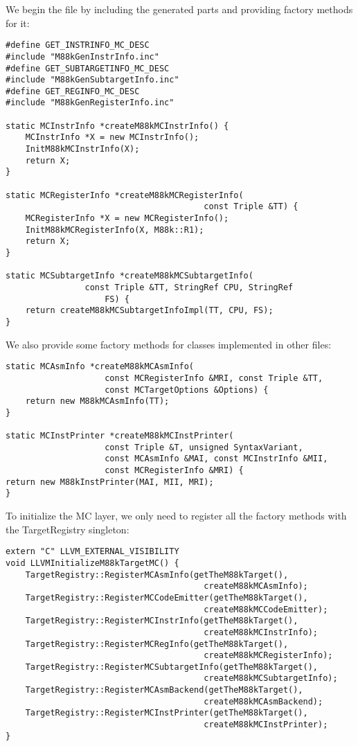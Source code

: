 We begin the file by including the generated parts and providing factory methods for it:\par

\begin{lstlisting}[caption={}]
#define GET_INSTRINFO_MC_DESC
#include "M88kGenInstrInfo.inc"
#define GET_SUBTARGETINFO_MC_DESC
#include "M88kGenSubtargetInfo.inc"
#define GET_REGINFO_MC_DESC
#include "M88kGenRegisterInfo.inc"

static MCInstrInfo *createM88kMCInstrInfo() {
	MCInstrInfo *X = new MCInstrInfo();
	InitM88kMCInstrInfo(X);
	return X;
}

static MCRegisterInfo *createM88kMCRegisterInfo(
										const Triple &TT) {
	MCRegisterInfo *X = new MCRegisterInfo();
	InitM88kMCRegisterInfo(X, M88k::R1);
	return X;
}

static MCSubtargetInfo *createM88kMCSubtargetInfo(
				const Triple &TT, StringRef CPU, StringRef
					FS) {
	return createM88kMCSubtargetInfoImpl(TT, CPU, FS);
}
\end{lstlisting}

We also provide some factory methods for classes implemented in other files:\par

\begin{lstlisting}[caption={}]
static MCAsmInfo *createM88kMCAsmInfo(
					const MCRegisterInfo &MRI, const Triple &TT,
					const MCTargetOptions &Options) {
	return new M88kMCAsmInfo(TT);
}

static MCInstPrinter *createM88kMCInstPrinter(
					const Triple &T, unsigned SyntaxVariant,
					const MCAsmInfo &MAI, const MCInstrInfo &MII,
					const MCRegisterInfo &MRI) {
return new M88kInstPrinter(MAI, MII, MRI);
}
\end{lstlisting}

To initialize the MC layer, we only need to register all the factory methods with the TargetRegistry singleton:\par

\begin{lstlisting}[caption={}]
extern "C" LLVM_EXTERNAL_VISIBILITY
void LLVMInitializeM88kTargetMC() {
	TargetRegistry::RegisterMCAsmInfo(getTheM88kTarget(),
										createM88kMCAsmInfo);
	TargetRegistry::RegisterMCCodeEmitter(getTheM88kTarget(),
										createM88kMCCodeEmitter);
	TargetRegistry::RegisterMCInstrInfo(getTheM88kTarget(),
										createM88kMCInstrInfo);
	TargetRegistry::RegisterMCRegInfo(getTheM88kTarget(),
										createM88kMCRegisterInfo);
	TargetRegistry::RegisterMCSubtargetInfo(getTheM88kTarget(),
										createM88kMCSubtargetInfo);
	TargetRegistry::RegisterMCAsmBackend(getTheM88kTarget(),
										createM88kMCAsmBackend);
	TargetRegistry::RegisterMCInstPrinter(getTheM88kTarget(),
										createM88kMCInstPrinter);
}
\end{lstlisting}

